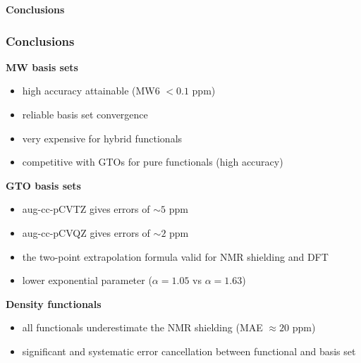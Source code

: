 \begin{frame}
    \centering
    \textbf{\Large{Conclusions}}
\end{frame}

\begin{frame}
\frametitle{Conclusions}
\textbf{MW basis sets}
\begin{itemize}
    \item   high accuracy attainable (MW6 $< 0.1$ ppm)
    \item   reliable basis set convergence
    \item   very expensive for hybrid functionals
    \item   competitive with GTOs for pure functionals (high accuracy)
\end{itemize}

\vspace{5mm}

\textbf{GTO basis sets}
\begin{itemize}
    \item   aug-cc-pCVTZ gives errors of $\sim 5$ ppm
    \item   aug-cc-pCVQZ gives errors of $\sim 2$ ppm
    \item   the two-point extrapolation formula valid for NMR shielding and DFT
    \item   lower exponential parameter ($\alpha = 1.05$ vs $\alpha = 1.63$) 
\end{itemize}

\vspace{5mm}

\textbf{Density functionals}
\begin{itemize}
    \item   all functionals underestimate the NMR shielding (MAE $\approx 20$ ppm) 
    \item   significant and systematic error cancellation between functional and basis set
\end{itemize}
\end{frame}

